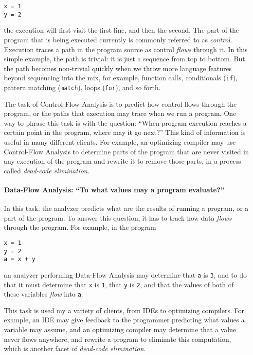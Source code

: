 \documentclass[12pt, oneside]{book}
\begin{document}
\begin{Verbatim}
x = 1
y = 2
\end{Verbatim}

\noindent the execution will first visit the first line, and then the second. The part of the program that is being executed currently is commonly referred to as \emph{control}. Execution traces a path in the program source as control \emph{flows} through it. In this simple example, the path is trivial: it is just a sequence from top to bottom. But the path becomes non-trivial quickly when we throw more language features beyond sequencing into the mix, for example, function calls, conditionals (\texttt{if}), pattern matching (\texttt{match}), loops (\texttt{for}), and so forth.

The task of Control-Flow Analysis is to predict how control flows through the program, or the paths that execution may trace when we run a program. One way to phrase this task is with the question: “When program execution reaches a certain point in the program, where may it go next?” This kind of information is useful in many different clients. For example, an optimizing compiler may use Control-Flow Analysis to determine parts of the program that are never visited in any execution of the program and rewrite it to remove those parts, in a process called \emph{dead-code elimination}.

\paragraph{Data-Flow Analysis: “To what values may a program evaluate?”}

In this task, the analyzer predicts what are the results of running a program, or a part of the program. To answer this question, it has to track how data \emph{flows} through the program. For example, in the program

\begin{Verbatim}
x = 1
y = 2
a = x + y
\end{Verbatim}

\noindent an analyzer performing Data-Flow Analysis may determine that \texttt{a} is \texttt{3}, and to do that it must determine that \texttt{x} is \texttt{1}, that \texttt{y} is \texttt{2}, and that the values of both of these variables \emph{flow} into \texttt{a}.

This task is used my a variety of clients, from IDEs to optimizing compilers. For example, an IDE may give feedback to the programmer predicting what values a variable may assume, and an optimizing compiler may determine that a value never flows anywhere, and rewrite a program to eliminate this computation, which is another facet of \emph{dead-code elimination}.
\end{document}
